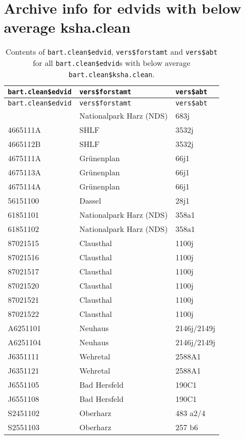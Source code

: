 \section{Archive info for edvids with below average ksha.clean}

\begin{singlespace}
  {\tabulinesep=2mm
    \begin{longtabu}{l l L}
      \caption{Contents of \texttt{bart.clean\$edvid}, \texttt{vers\$forstamt} and \texttt{vers\$abt} for all \texttt{bart.clean\$edvid}s with below average \texttt{bart.clean\$ksha.clean}.
        \label{tab:special_remarks}} \\
      \toprule
      \texttt{bart.clean\$edvid} & \texttt{vers\$forstamt} & \texttt{vers\$abt} \\
      \midrule
      \endfirsthead
      \texttt{bart.clean\$edvid} & \texttt{vers\$forstamt} & \texttt{vers\$abt} \\
      \midrule
      \endhead
      \bottomrule
       & Nationalpark Harz (NDS) & 683j \\
      4665111A & SHLF & 3532j \\
      4665112B & SHLF & 3532j \\
      4675111A & Grünenplan & 66j1 \\
      4675113A & Grünenplan & 66j1 \\
      4675114A & Grünenplan & 66j1 \\
      56151100 & Dassel & 28j1 \\
      61851101 & Nationalpark Harz (NDS) & 358a1 \\
      61851102 & Nationalpark Harz (NDS) & 358a1 \\
      87021515 & Clausthal & 1100j \\
      87021516 & Clausthal & 1100j \\
      87021517 & Clausthal & 1100j \\
      87021520 & Clausthal & 1100j \\
      87021521 & Clausthal & 1100j \\
      87021522 & Clausthal & 1100j \\
      A6251101 & Neuhaus & 2146j/2149j \\
      A6251104 & Neuhaus & 2146j/2149j \\
      J6351111 & Wehretal & 2588A1 \\
      J6351121 & Wehretal & 2588A1 \\
      J6551105 & Bad Hersfeld & 190C1 \\
      J6551108 & Bad Hersfeld & 190C1 \\
      S2451102 & Oberharz & 483 a2/4 \\
      S2551103 & Oberharz & 257 b6 \\
    \end{longtabu}
  }
\end{singlespace}



